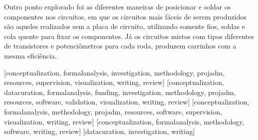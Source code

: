 \documentclass[portuguese]{textolivre}
\begin{document}
Outro ponto explorado foi as diferentes maneiras de posicionar e soldar os componentes nos circuitos, em que os circuitos mais fáceis de serem produzidos são aqueles realizados sem a placa de circuito, utilizando somente fios, soldas e cola quente para fixar os componentes. Já os circuitos mistos com tipos diferentes de transistores e potenciômetros para cada roda, produzem carrinhos com a mesma eficiência.

\printbibliography\label{sec-bib}


\begin{contributors}
    [conceptualization, formalanalysis,  investigation, methodology, projadm, resources, supervision, visualization, writing, review]
    [conceptualization, datacuration, formalanalysis,  funding,  investigation, methodology, projadm, resources, software, validation, visualization, writing, review]
    [conceptualization, formalanalysis,  methodology, projadm, resources, software, supervision, visualization, writing, review]
    [conceptualization, formalanalysis, methodology, software, writing, review]
    [datacuration, investigation, writing]
\end{contributors}
\end{document}
